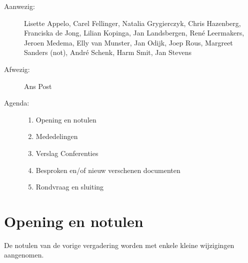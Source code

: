 
   \RosSupersedes{-}
   \MakeRosTitle

\begin{description}
\item[Aanwezig:] Lisette Appelo, Carel Fellinger, Natalia Grygierczyk,
                 Chris Hazenberg, Franciska de Jong, 
                 Lilian Kopinga, Jan Landsbergen, Ren\'{e} Leermakers, 
                 Jeroen Medema, Elly van Munster, 
                 Jan Odijk, Joep Rous, Margreet Sanders (not),
                 Andr\'{e} Schenk, 
                 Harm Smit, Jan Stevens
\item[Afwezig:]  Ans Post
\item[Agenda:]
  \begin{enumerate}
  \item Opening en notulen
  \item Mededelingen
  \item Verslag Conferenties
  \item Besproken en/of nieuw verschenen documenten
  \item Rondvraag en sluiting
  \end{enumerate}
\end{description}

\section{Opening en notulen}
De notulen van de vorige vergadering worden met enkele kleine wijzigingen 
aangenomen.

